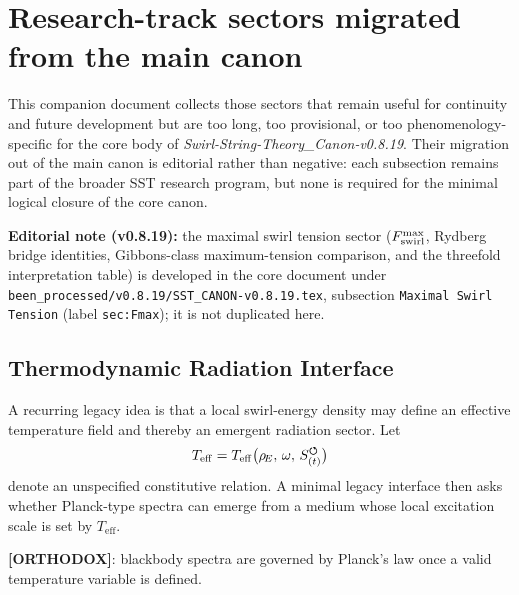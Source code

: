 \makeatletter
{}
\makeatother


\section{Research-track sectors migrated from the main canon}

\noindent
This companion document collects those sectors that remain useful for continuity and future development but are too long, too provisional, or too phenomenology-specific for the core body of \textit{Swirl-String-Theory\_Canon-v0.8.19}. Their migration out of the main canon is editorial rather than negative: each subsection remains part of the broader SST research program, but none is required for the minimal logical closure of the core canon.

\medskip
\noindent
\textbf{Editorial note (v0.8.19):} the maximal swirl tension sector ($F_{\rm swirl}^{\max}$, Rydberg bridge identities, Gibbons-class maximum-tension comparison, and the threefold interpretation table) is developed in the core document under \verb|been_processed/v0.8.19/SST_CANON-v0.8.19.tex|, subsection \texttt{Maximal Swirl Tension} (label \texttt{sec:Fmax}); it is not duplicated here.

\medskip








\subsection{Thermodynamic Radiation Interface}
A recurring legacy idea is that a local swirl-energy density may define an effective temperature field and thereby an emergent radiation sector. Let
\begin{align}
    T_{\mathrm{eff}} = T_{\mathrm{eff}}\big(\rho_{\!E},\, \omega,\, S_{(t)}^{\boldsymbol{\circlearrowleft}}\big)
\end{align}
denote an unspecified constitutive relation. A minimal legacy interface then asks whether Planck-type spectra can emerge from a medium whose local excitation scale is set by $T_{\mathrm{eff}}$.

\textbf{[ORTHODOX]}: blackbody spectra are governed by Planck's law once a valid temperature variable is defined.

